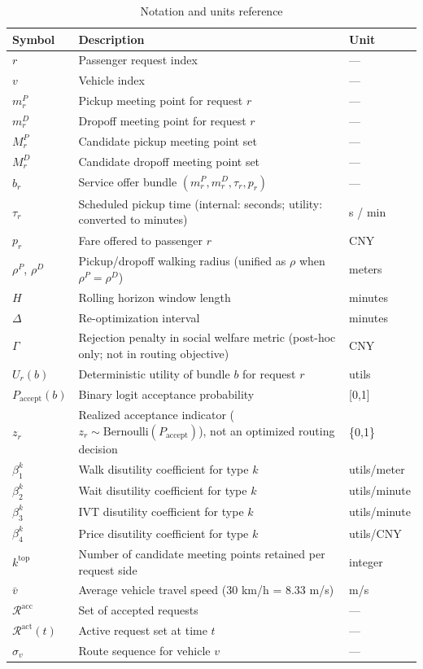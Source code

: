 \documentclass[review,12pt]{elsarticle}
\begin{document}
\begin{table}[h]
\centering
\caption{Notation and units reference}
\label{tab:notation}
\begin{tabular}{lll}
\toprule
Symbol & Description & Unit \\
\midrule
$r$ & Passenger request index & --- \\
$v$ & Vehicle index & --- \\
$m_r^P$ & Pickup meeting point for request $r$ & --- \\
$m_r^D$ & Dropoff meeting point for request $r$ & --- \\
$M_r^P$ & Candidate pickup meeting point set & --- \\
$M_r^D$ & Candidate dropoff meeting point set & --- \\
$b_r$ & Service offer bundle $(m_r^P, m_r^D, \tau_r, p_r)$ & --- \\
$\tau_r$ & Scheduled pickup time (internal: seconds; utility: converted to minutes) & s / min \\
$p_r$ & Fare offered to passenger $r$ & CNY \\
$\rho^P$, $\rho^D$ & Pickup/dropoff walking radius (unified as $\rho$ when $\rho^P = \rho^D$) & meters \\
$H$ & Rolling horizon window length & minutes \\
$\Delta$ & Re-optimization interval & minutes \\
$\Gamma$ & Rejection penalty in social welfare metric (post-hoc only; not in routing objective) & CNY \\
$U_r(b)$ & Deterministic utility of bundle $b$ for request $r$ & utils \\
$P_{\text{accept}}(b)$ & Binary logit acceptance probability & [0,1] \\
$z_r$ & Realized acceptance indicator ($z_r \sim \text{Bernoulli}(P_{\text{accept}})$), not an optimized routing decision & \{0,1\} \\
$\beta_1^k$ & Walk disutility coefficient for type $k$ & utils/meter \\
$\beta_2^k$ & Wait disutility coefficient for type $k$ & utils/minute \\
$\beta_3^k$ & IVT disutility coefficient for type $k$ & utils/minute \\
$\beta_4^k$ & Price disutility coefficient for type $k$ & utils/CNY \\
$k^{\text{top}}$ & Number of candidate meeting points retained per request side & integer \\
$\bar{v}$ & Average vehicle travel speed (30 km/h = 8.33 m/s) & m/s \\
$\mathcal{R}^{\text{acc}}$ & Set of accepted requests & --- \\
$\mathcal{R}^{\text{act}}(t)$ & Active request set at time $t$ & --- \\
$\sigma_v$ & Route sequence for vehicle $v$ & --- \\
\bottomrule
\end{tabular}
\end{table}
\end{document}
